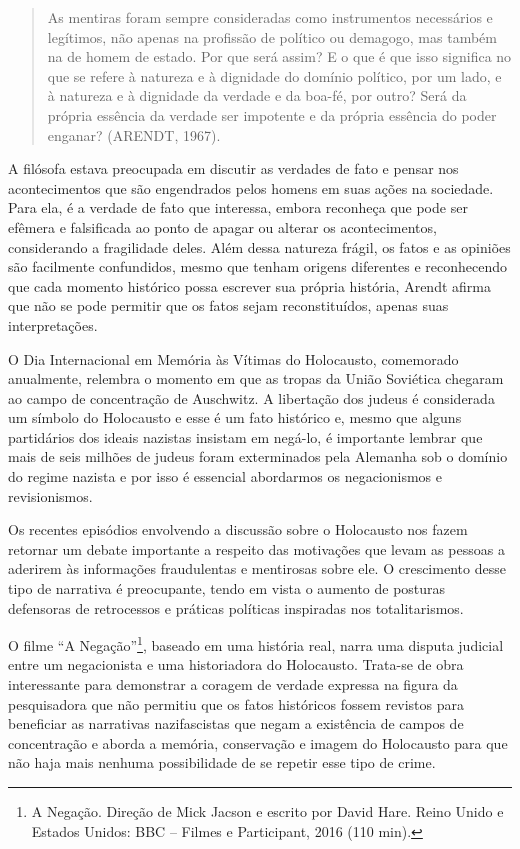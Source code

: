 \begin{quote}
As mentiras foram sempre consideradas como instrumentos necessários e
legítimos, não apenas na profissão de político ou demagogo, mas também
na de homem de estado. Por que será assim? E o que é que isso significa
no que se refere à natureza e à dignidade do domínio político, por um
lado, e à natureza e à dignidade da verdade e da boa-fé, por outro? Será
da própria essência da verdade ser impotente e da própria essência do
poder enganar? (ARENDT, 1967).
\end{quote}

A filósofa estava preocupada em discutir as verdades de fato e pensar
nos acontecimentos que são engendrados pelos homens em suas ações na
sociedade. Para ela, é a verdade de fato que interessa, embora reconheça
que pode ser efêmera e falsificada ao ponto de apagar ou alterar os
acontecimentos, considerando a fragilidade deles. Além dessa natureza
frágil, os fatos e as opiniões são facilmente confundidos, mesmo que
tenham origens diferentes e reconhecendo que cada momento histórico
possa escrever sua própria história, Arendt afirma que não se pode
permitir que os fatos sejam reconstituídos, apenas suas interpretações.

O Dia Internacional em Memória às Vítimas do Holocausto, comemorado
anualmente, relembra o momento em que as tropas da União Soviética
chegaram ao campo de concentração de Auschwitz. A libertação dos judeus
é considerada um símbolo do Holocausto e esse é um fato histórico e,
mesmo que alguns partidários dos ideais nazistas insistam em negá-lo, é
importante lembrar que mais de seis milhões de judeus foram exterminados
pela Alemanha sob o domínio do regime nazista e por isso é essencial
abordarmos os negacionismos e revisionismos.

Os recentes episódios envolvendo a discussão sobre o Holocausto nos
fazem retornar um debate importante a respeito das motivações que levam
as pessoas a aderirem às informações fraudulentas e mentirosas sobre
ele. O crescimento desse tipo de narrativa é preocupante, tendo em vista
o aumento de posturas defensoras de retrocessos e práticas políticas
inspiradas nos totalitarismos.

O filme ``A Negação''\footnote{A Negação. Direção de Mick Jacson e
  escrito por David Hare. Reino Unido e Estados Unidos: BBC -- Filmes e
  Participant, 2016 (110 min).}, baseado em uma história real, narra uma
disputa judicial entre um negacionista e uma historiadora do Holocausto.
Trata-se de obra interessante para demonstrar a coragem de verdade
expressa na figura da pesquisadora que não permitiu que os fatos
históricos fossem revistos para beneficiar as narrativas nazifascistas
que negam a existência de campos de concentração e aborda a memória,
conservação e imagem do Holocausto para que não haja mais nenhuma
possibilidade de se repetir esse tipo de crime.


